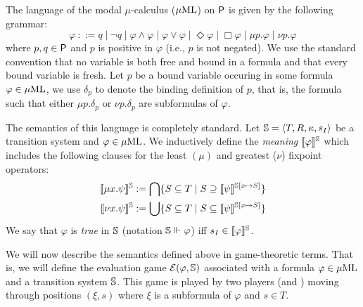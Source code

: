 
The language of the modal $\mu$-calculus ($\mu\mathrm{ML}$) on $\mathsf{P}$ is given by the following grammar:
%
\begin{equation*}
    \varphi\ ::= q \mid \neg q \mid \varphi \land \varphi \mid
    \varphi \lor \varphi \mid  \Diamond \varphi \mid \Box \varphi \mid
    \mu p.\varphi \mid \nu p.\varphi
\end{equation*}
%
where $p,q \in \mathsf{P}$ and $p$ is positive in $\varphi$ (i.e., $p$ is not negated).
We use the standard convention that no variable is both free and bound in a formula and that every bound variable is fresh.
%
Let $p$ be a bound variable occuring in some formula $\varphi \in \mu\mathrm{ML}$, we use $\delta_p$ to denote the binding definition of $p$, that is, the formula such that either $\mu p.\delta_p$ or $\nu p.\delta_p$ are subformulas of $\varphi$.

The semantics of this language is completely standard. Let $\mathbb{S} = \langle{T,R,\kappa, s_I}\rangle$ be a transition system and $\varphi \in \mu\mathrm{ML}$. We inductively define the \emph{meaning} $\llbracket\varphi\rrbracket^{\mathbb{S}}$ which includes the following clauses for the least $(\mu)$ and greatest ($\nu$) fixpoint operators:
%
\begin{align*}
  \llbracket\mu x.\psi\rrbracket^{\mathbb{S}}  & :=   \bigcap \{S \subseteq T \mid S \supseteq \llbracket\psi\rrbracket^{\mathbb{S}[x\mapsto S]} \}  \\
  \llbracket\nu x.\psi\rrbracket^{\mathbb{S}}  & :=   \bigcup \{S \subseteq T \mid S \subseteq \llbracket\psi\rrbracket^{\mathbb{S}[x\mapsto S]} \}
\end{align*}
%
We say that $\varphi$ is \emph{true} in $\mathbb{S}$ (notation $\mathbb{S} \Vdash \varphi$) iff $s_I \in \llbracket\varphi\rrbracket^{\mathbb{S}}$.%

We will now describe the semantics defined above in game-theoretic terms. That is,
we will define the evaluation game $\mathcal{E}(\varphi,\mathbb{S})$ associated with a formula $\varphi \in \mu\mathrm{ML}$ and a transition system $\mathbb{S}$. This game is played by two players (\eloise and \abelard) moving through positions $(\xi,s)$ where $\xi$ is a subformula of $\varphi$ and $s \in T$.
%

